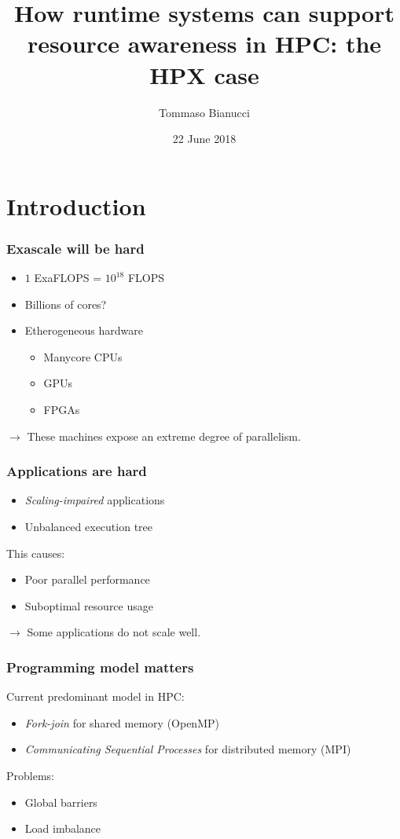 \documentclass[compress]{beamer}
\title[]{How runtime systems can support resource awareness in HPC: the HPX case}
\author{Tommaso Bianucci}
\date{22 June 2018}
\institute{Technische Universität München}
\begin{document}
\begin{frame}
\maketitle
\end{frame}

\section{Introduction}
\begin{frame}
	\frametitle{Exascale will be hard}
	\begin{itemize}
		\item $1$ ExaFLOPS = $10^{18}$ FLOPS
		\item Billions of cores?
		\item Etherogeneous hardware
		\begin{itemize}
			\item Manycore CPUs
			\item GPUs
			\item FPGAs
		\end{itemize}
	\end{itemize}
	\pause
	\vspace{5mm}
	$\longrightarrow$ These machines expose an extreme degree of parallelism.
\end{frame}

\begin{frame}
	\frametitle{Applications are hard}
	\begin{itemize}
		\item \emph{Scaling-impaired} applications
		\item Unbalanced execution tree
	\end{itemize}
	\pause
	This causes:
	\begin{itemize}
		\item Poor parallel performance
		\item Suboptimal resource usage
	\end{itemize}
	\pause
	\vspace{5mm}
	$\longrightarrow$ Some applications do not scale well.
\end{frame}

\begin{frame}
	\frametitle{Programming model matters}
	Current predominant model in HPC:
	\begin{itemize}
		\item \emph{Fork-join} for shared memory (OpenMP)
		\pause
		\item \emph{Communicating Sequential Processes} for distributed memory (MPI)
	\end{itemize}
	\pause
	Problems:
	\begin{itemize}
		\item Global barriers
		\item Load imbalance
	\end{itemize}
\end{frame}
\end{document}
